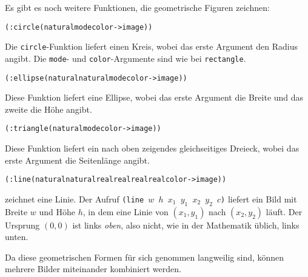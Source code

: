Es gibt es noch weitere Funktionen, die 
geometrische Figuren zeichnen:
%
\begin{alltt}
(: circle (natural mode color -> image))
\end{alltt}
%
Die \texttt{circle}-Funktion liefert einen Kreis, wobei das erste
Argument den Radius angibt.  Die \texttt{mode}- und
\texttt{color}-Argumente sind wie bei \texttt{rectangle}.
%
\begin{alltt}
(: ellipse (natural natural mode color -> image))
\end{alltt}
%
Diese Funktion liefert eine Ellipse,
wobei das erste Argument die Breite und das zweite die Höhe angibt.
%
\begin{alltt}
(: triangle (natural mode color -> image))
\end{alltt}
%
Diese Funktion liefert ein nach oben
zeigendes gleichseitiges Dreieck, wobei das erste Argument die
Seitenlänge angibt.
%
\begin{alltt}
(: line (natural natural real real real real color -> image))
\end{alltt}
%
zeichnet eine Linie.  Der Aufruf
\texttt{(line $w$ $h$ $x_1$ $y_1$ $x_2$ $y_2$ $c$)} liefert ein Bild
mit Breite $w$ und Höhe $h$, in dem eine Linie von $(x_1, y_1)$ nach
$(x_2, y_2)$ läuft.  Der Ursprung $(0,0)$ ist links \emph{oben},
also nicht, wie in der Mathematik üblich, links unten.

Da diese geometrischen Formen für sich genommen langweilig sind, können
mehrere Bilder miteinander kombiniert werden.

